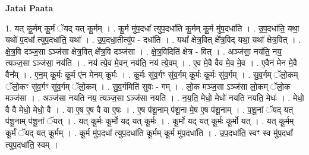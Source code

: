 \documentclass[17pt]{extarticle}
\begin{document}
\textbf{Jatai Paata} \newline

1. यत् कू॒र्मम् कू॒र्मं ॅयद् यत् कू॒र्मम् । . कू॒र्म मु॑प॒दधा᳚ त्युप॒दधा॑ति कू॒र्मम् कू॒र्म मु॑प॒दधा॑ति । . उ॒प॒दधा॑ति॒ यथा॒ यथो॑ प॒दधा᳚ त्युप॒दधा॑ति॒ यथा᳚ । . उ॒प॒दधा॒तीत्यु॑प - दधा॑ति । . यथा᳚ क्षेत्र॒वित् क्षे᳚त्र॒विद् यथा॒ यथा᳚ क्षेत्र॒वित् । . क्षे॒त्र॒वि दञ्ज॒सा ऽञ्ज॑सा क्षेत्र॒वित् क्षे᳚त्र॒वि दञ्ज॑सा । . क्षे॒त्र॒विदिति॑ क्षेत्र - वित् । . अञ्ज॑सा॒ नय॑ति॒ नय॒ त्यञ्ज॒सा ऽञ्ज॑सा॒ नय॑ति । . नय॑ त्ये॒व मे॒वन् नय॑ति॒ नय॑ त्ये॒वम् । . ए॒व मे॒वै वैव मे॒व मे॒व । . ए॒वैन॑ मेन मे॒वै वैन᳚म् । . ए॒न॒म् कू॒र्मः कू॒र्म ए॑न मेनम् कू॒र्मः । . कू॒र्मः सु॑व॒र्गꣳ सु॑व॒र्गम् कू॒र्मः कू॒र्मः सु॑व॒र्गम् । . सु॒व॒र्गम् ॅलो॒कम् ॅलो॒कꣳ सु॑व॒र्गꣳ सु॑व॒र्गम् ॅलो॒कम् । . सु॒व॒र्गमिति॑ सुवः - गम् । . लो॒क मञ्ज॒सा ऽञ्ज॑सा लो॒कम् ॅलो॒क मञ्ज॑सा । . अञ्ज॑सा नयति नय॒ त्यञ्ज॒सा ऽञ्ज॑सा नयति । . न॒य॒ति॒ मेधो॒ मेधो॑ नयति नयति॒ मेधः॑ । . मेधो॒ वै वै मेधो॒ मेधो॒ वै । . वा ए॒ष ए॒ष वै वा ए॒षः । . ए॒ष प॑शू॒नाम् प॑शू॒ना मे॒ष ए॒ष प॑शू॒नाम् । . प॒शू॒नां ॅयद् यत् प॑शू॒नाम् प॑शू॒नां ॅयत् । . यत् कू॒र्मः कू॒र्मो यद् यत् कू॒र्मः । . कू॒र्मो यद् यत् कू॒र्मः कू॒र्मो यत् । . यत् कू॒र्मम् कू॒र्मं ॅयद् यत् कू॒र्मम् । . कू॒र्म मु॑प॒दधा᳚ त्युप॒दधा॑ति कू॒र्मम् कू॒र्म मु॑प॒दधा॑ति । . उ॒प॒दधा॑ति॒ स्वꣳ स्व मु॑प॒दधा᳚ त्युप॒दधा॑ति॒ स्वम् । \newline
\end{document}
